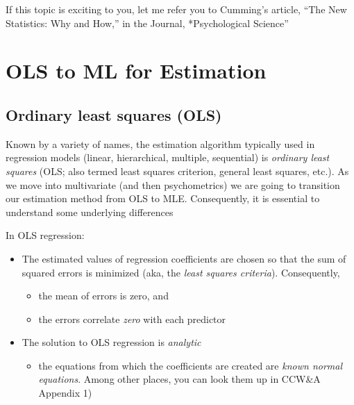 \documentclass[
]{book}
\providecommand{\tightlist}{%
  \setlength{\itemsep}{0pt}\setlength{\parskip}{0pt}}
\begin{document}
If this topic is exciting to you, let me refer you to Cumming's \citep{cumming_new_2014} article, ``The New Statistics: Why and How,'' in the Journal, *Psychological Science''

\hypertarget{ols-to-ml-for-estimation}{%
\section{OLS to ML for Estimation}\label{ols-to-ml-for-estimation}}

\hypertarget{ordinary-least-squares-ols}{%
\subsection{Ordinary least squares (OLS)}\label{ordinary-least-squares-ols}}

Known by a variety of names, the estimation algorithm typically used in regression models (linear, hierarchical, multiple, sequential) is \emph{ordinary least squares} (OLS; also termed least squares criterion, general least squares, etc.). As we move into multivariate (and then psychometrics) we are going to transition our estimation method from OLS to MLE. Consequently, it is essential to understand some underlying differences \citep{cohen_applied_2003, myung_tutorial_2003}

In OLS regression:

\begin{itemize}
\tightlist
\item
  The estimated values of regression coefficients are chosen so that the sum of squared errors is minimized (aka, the \emph{least squares criteria}). Consequently,

  \begin{itemize}
  \tightlist
  \item
    the mean of errors is zero, and
  \item
    the errors correlate \emph{zero} with each predictor
  \end{itemize}
\item
  The solution to OLS regression is \emph{analytic}

  \begin{itemize}
  \tightlist
  \item
    the equations from which the coefficients are created are \emph{known normal equations}. Among other places, you can look them up in CCW\&A \citep{cohen_introduction_1934} Appendix 1)
  \end{itemize}
\end{itemize}
\end{document}
